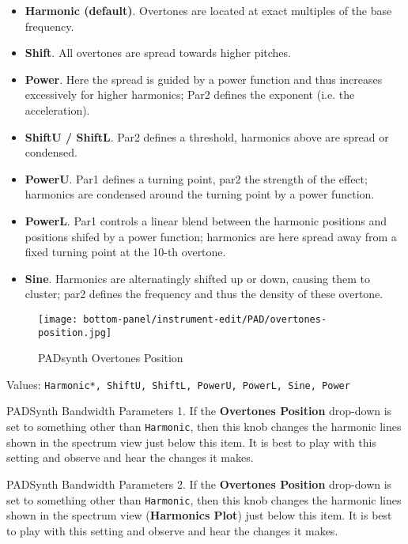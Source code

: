    \begin{itemize}
      \item \textbf{Harmonic (default)}.
         Overtones are located at exact multiples of the base frequency.
      \item \textbf{Shift}.
         All overtones are spread towards higher pitches.
      \item \textbf{Power}.
         Here the spread is guided by a power function and thus increases
         excessively for higher harmonics;
         Par2 defines the exponent (i.e. the acceleration).
      \item \textbf{ShiftU / ShiftL}.
         Par2 defines a threshold, harmonics above are spread or condensed.
      \item \textbf{PowerU}.
         Par1 defines a turning point, par2 the strength of the effect;
         harmonics are condensed around the turning point by a power function.
      \item \textbf{PowerL}.
         Par1 controls a linear blend between the harmonic positions and positions
         shifed by a power function;
         harmonics are here spread away from a fixed turning point at the 10-th
         overtone.
      \item \textbf{Sine}.
         Harmonics are alternatingly shifted up or down, causing them to cluster;
         par2 defines the frequency and thus the density of these overtone.
   \end{itemize}

\begin{figure}[H]
   \centering
   \texttt{[image: bottom-panel/instrument-edit/PAD/overtones-position.jpg]}
   \caption{PADsynth Overtones Position}
   \label{fig:padsynth_overtones_position}
\end{figure}

   Values: \texttt{Harmonic*, ShiftU, ShiftL, PowerU, PowerL, Sine, Power}

   PADSynth Bandwidth Parameters 1.
   If the \textbf{Overtones Position} drop-down is set to something other than
   \texttt{Harmonic}, then this knob changes the harmonic lines shown in the
   spectrum view just below this item.
   It is best to play with this setting and observe and hear the changes it
   makes.

   PADSynth Bandwidth Parameters 2.
   If the \textbf{Overtones Position} drop-down is set to something other than
   \texttt{Harmonic}, then this knob changes the harmonic lines shown in the
   spectrum view (\textbf{Harmonics Plot}) just below this item.
   It is best to play with this setting and observe and hear the changes it
   makes.

